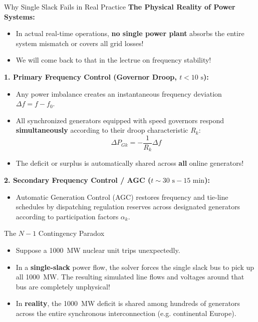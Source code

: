 \begin{frame}[allowframebreaks]{Why Single Slack Fails in Real Practice}
    \textbf{The Physical Reality of Power Systems:}
    \begin{itemize}
        \item In actual real-time operations, \textbf{no single power plant} absorbs the entire system mismatch or covers all grid losses!
        \item We will come back to that in the lectrue on frequency stability! 
    \end{itemize}
    
    \textbf{1. Primary Frequency Control (Governor Droop, $t < 10\text{ s}$):}
    \begin{itemize}
        \item Any power imbalance creates an instantaneous frequency deviation $\Delta f = f - f_0$.
        \item All synchronized generators equipped with speed governors respond \textbf{simultaneously} according to their droop characteristic $R_k$:
        $$\Delta P_{Gk} = -\frac{1}{R_k} \Delta f$$
        \item The deficit or surplus is automatically shared across \textbf{all} online generators!
    \end{itemize}

    \textbf{2. Secondary Frequency Control / AGC ($t \sim 30\text{ s} - 15\text{ min}$):}
    \begin{itemize}
        \item Automatic Generation Control (AGC) restores frequency and tie-line schedules by dispatching regulation reserves across designated generators according to participation factors $\alpha_k$.
    \end{itemize}
    
    \vspace{0.2cm}
    \begin{alertblock}{The $N-1$ Contingency Paradox}
        \begin{itemize}
            \item Suppose a 1000~MW nuclear unit trips unexpectedly.
            \item In a \textbf{single-slack} power flow, the solver forces the single slack bus to pick up all 1000~MW. The resulting simulated line flows and voltages around that bus are completely unphysical!
            \item In \textbf{reality}, the 1000~MW deficit is shared among hundreds of generators across the entire synchronous interconnection (e.g. continental Europe).
        \end{itemize}
    \end{alertblock}
\end{frame}

